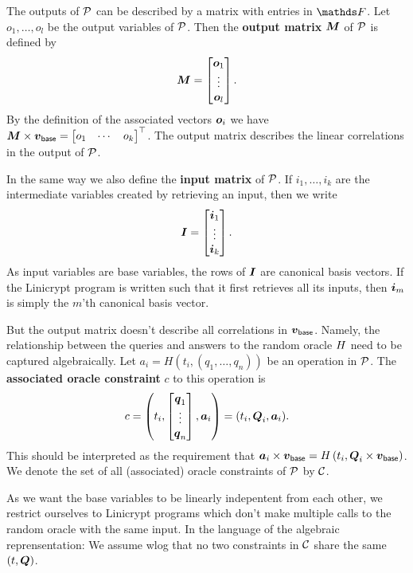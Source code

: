 The outputs of $\P$ can be described by a matrix with entries in $\F$.
Let $o_1, \dots, o_l$ be the output variables of $\P$.
Then the \textbf{output matrix} $\M$ of $\P$ is defined by
\[
  \M =
  \begin{bmatrix}
  \v o_1\\
  \vdots \\
  \v o_l
  \end{bmatrix}
  .
\]
By the definition of the associated vectors $\v o_i$ we have
$
\M \times \vbase = 
  \begin{bmatrix} o_1 & \cdots & o_k \end{bmatrix}^\top
$.
The output matrix describes the linear correlations in the output of $\P$.

In the same way we also define the \textbf{input matrix} of $\P$.
If $i_1, \dots, i_k$ are the intermediate variables created by retrieving an input,
then we write
\[
  \Inp = \begin{bmatrix}
  \v i_1 \\
  \vdots \\
  \v i_k
  \end{bmatrix}.
\]
As input variables are base variables,
the rows of $\Inp$ are canonical basis vectors.
If the Linicrypt program is written such that it first retrieves all its inputs,
then $\v i_m$ is simply the $m$'th canonical basis vector. 

But the output matrix doesn't describe all correlations in $\vbase$.
Namely, the relationship between the queries and answers to the random oracle $\H$ need to be captured algebraically.
Let $a_i = H(t_i, (q_1, \dots, q_n))$ be an operation in $\P$.
The \textbf{associated oracle constraint} $c$ to this operation is
\[
  c = \left( t_i, \begin{bmatrix}
  \v q_1 \\
  \vdots \\
  \v q_n
  \end{bmatrix},
  \va_i \right)
	=
	(t_i, \Q_i, \va_i)
	.
\]
This should be interpreted as the requirement that
$
\va_i \times \vbase = \H \left( t_i, \Q_i \times \vbase \right)
$.
We denote the set of all (associated) oracle constraints of $\P$ by $\C$.

As we want the base variables to be linearly indepentent from each other,
we restrict ourselves to Linicrypt programs which don't make multiple calls to the random oracle with the same input.
In the language of the algebraic reprensentation:
We assume wlog that no two constraints in $\C$ share the same $(t, \Q)$.


